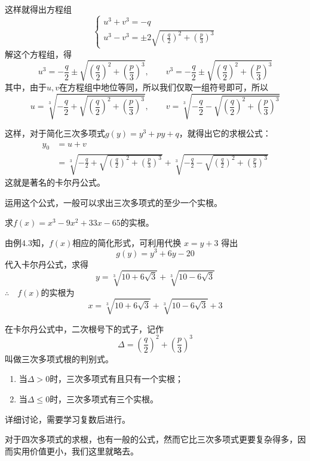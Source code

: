 这样就得出方程组
\[\begin{cases}
    u^3+v^3=-q\\
    u^3-v^3=\pm 2\sqrt{\left(\frac{q}{2}\right)^2+\left(\frac{p}{3}\right)^3}
\end{cases}\]
解这个方程组，得
\[u^3=-\frac{q}{2}\pm \sqrt{\left(\frac{q}{2}\right)^2+\left(\frac{p}{3}\right)^3},\qquad v^3=-\frac{q}{2}\pm \sqrt{\left(\frac{q}{2}\right)^2+\left(\frac{p}{3}\right)^3}\]
其中，由于$u,v$在方程组中地位等同，所以我们仅取一组符号即可，所以
\[u=\sqrt[3]{-\frac{q}{2}+ \sqrt{\left(\frac{q}{2}\right)^2+\left(\frac{p}{3}\right)^3}},\qquad v=\sqrt[3]{-\frac{q}{2}- \sqrt{\left(\frac{q}{2}\right)^2+\left(\frac{p}{3}\right)^3}}\]

这样，对于简化三次多项式$g(y)=y^3+py+q$，就得出它的求根公式：
\[\begin{split}
    y_0&=u+v\\
    &=\sqrt[3]{-\frac{q}{2}+ \sqrt{\left(\frac{q}{2}\right)^2+\left(\frac{p}{3}\right)^3}}+\sqrt[3]{-\frac{q}{2}- \sqrt{\left(\frac{q}{2}\right)^2+\left(\frac{p}{3}\right)^3}}
\end{split}\]
这就是著名的卡尔丹公式。

运用这个公式，一般可以求出三次多项式的至少一个实根。


\begin{example}
    求$f(x)=x^3-9x^2+33x-65$的实根。
\end{example}

\begin{solution}
    由例4.3知，$f(x)$相应的简化形式，可利用代换
$x=y+3$ 得出
\[g(y)=y^3+6y-20\]
代入卡尔丹公式，求得
\[y=\sqrt[3]{10+6\sqrt{3}}+\sqrt[3]{10-6\sqrt{3}}\]
$\therefore\quad f(x)$的实根为
\[x=\sqrt[3]{10+6\sqrt{3}}+\sqrt[3]{10-6\sqrt{3}}+3\]
\end{solution}

\begin{rmk}
在卡尔丹公式中，二次根号下的式子，记作
\[\Delta=\left(\frac{q}{2}\right)^2+\left(\frac{p}{3}\right)^3\]
叫做三次多项式根的判别式。
\begin{enumerate}
    \item 当$\Delta>0$时，三次多项式有且只有一个实根；
    \item 当$\Delta\le 0$时，三次多项式有三个实根。
\end{enumerate}
详细讨论，需要学习复数后进行。
\end{rmk}

对于四次多项式的求根，也有一般的公式，然而它比三次多项式更要复杂得多，因而实用价值更小，我们这里就略去。

